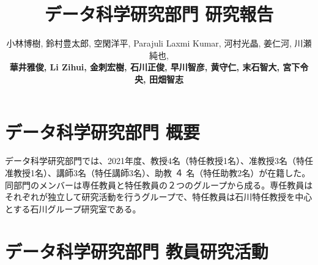 \documentclass[11pt]{jarticle}
\title{データ科学研究部門 研究報告}
\author{小林博樹, 鈴村豊太郎, 空閑洋平, Parajuli Laxmi Kumar, 河村光晶, 姜仁河, 川瀬純也, \\
\textbf{華井雅俊, Li Zihui, 金刺宏樹, 石川正俊, 早川智彦, 黄守仁, 末石智大, 宮下令央, 田畑智志}}
\begin{document}
\maketitle

\section{データ科学研究部門 概要}
データ科学研究部門では、2021年度、教授4名（特任教授1名）、准教授3名（特任准教授1名）、講師3名（特任講師3名）、助教 ４ 名（特任助教2名）が在籍した。同部門のメンバーは専任教員と特任教員の２つのグループから成る。専任教員はそれぞれが独立して研究活動を行うグループで、特任教員は石川特任教授を中心とする石川グループ研究室である。


%



\section{データ科学研究部門 教員研究活動}
\end{document}
